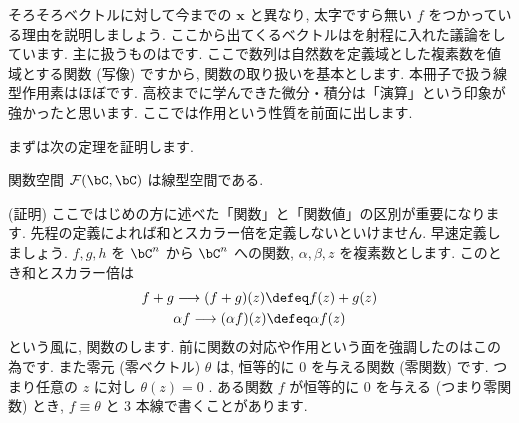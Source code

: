 \documentclass[openany, a4paper, oneside]{jsbook}
\begin{document}
そろそろベクトルに対して今までの $\bm{x}$ と異なり, 太字ですら無い $f$ をつかっている理由を説明しましょう.
ここから出てくるベクトルはを射程に入れた議論をしています.
主に扱うものはです.
ここで数列は自然数を定義域とした複素数を値域とする関数 (写像) ですから, 関数の取り扱いを基本とします.
本冊子で扱う線型作用素はほぼです.
高校までに学んできた微分・積分は「演算」という印象が強かったと思います.
ここでは作用という性質を前面に出します.

まずは次の定理を証明します.
\begin{thm}
関数空間 $\mathcal{F}(\bC,\bC)$
は線型空間である.
\end{thm}
(証明)
ここではじめの方に述べた「関数」と「関数値」の区別が重要になります.
先程の定義によれば和とスカラー倍を定義しないといけません. 早速定義しましょう.
 $f,g,h$ を $\bC^n$ から $\bC^n$ への関数,  $\alpha,\beta,z$ を複素数とします.
このとき和とスカラー倍は
\begin{gather}
    f + g \longrightarrow  (f+g) (z) \defeq f (z) + g (z) \\
    \alpha f \longrightarrow (\alpha f) (z) \defeq \alpha f (z)
\end{gather}
という風に, 関数のします.
前に関数の対応や作用という面を強調したのはこの為です.
また零元 (零ベクトル) $\theta$ は, 恒等的に $0$ を与える関数 (零関数) です. つまり任意の $z$ に対し $\theta (z)=0$ .
ある関数 $f$ が恒等的に $0$ を与える (つまり零関数) とき,  $f\equiv \theta$ と 3 本線で書くことがあります.
\end{document}
